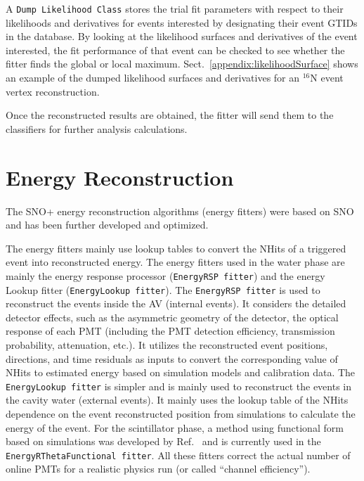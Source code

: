 A \texttt{Dump Likelihood Class} stores the trial fit parameters with respect to their likelihoods and derivatives for events interested by designating their event GTIDs in the database. By looking at the likelihood surfaces and derivatives of the event interested, the fit performance of that event can be checked to see whether the fitter finds the global or local maximum. Sect.~\ref{appendix:likelihoodSurface} shows an example of the dumped likelihood surfaces and derivatives for an $^{16}$N event vertex reconstruction. 

Once the reconstructed results are obtained, the fitter will send them to the classifiers for further analysis calculations. 

\section{Energy Reconstruction}\label{sect:energyFitter}
The SNO+ energy reconstruction algorithms (energy fitters) were based on SNO\cite{boulay2004direct,moffat2001optical} and has been further developed and optimized\cite{jones2011background,walker2016study,energyRSP}. 

The energy fitters mainly use lookup tables to convert the NHits of a triggered event into reconstructed energy. The energy fitters used in the water phase are mainly the energy response processor (\texttt{EnergyRSP fitter})\cite{boulay2004direct,moffat2001optical,walker2016study} and the energy Lookup fitter (\texttt{EnergyLookup fitter})\cite{jones2011background,energyFunctional}. The \texttt{EnergyRSP fitter} is used to reconstruct the events inside the AV (internal events). It considers the detailed detector effects, such as the asymmetric geometry of the detector, the optical response of each PMT (including the PMT detection efficiency, transmission probability, attenuation, etc.). It utilizes the reconstructed event positions, directions, and time residuals as inputs to convert the corresponding value of NHits to estimated energy based on simulation models and calibration data. The \texttt{EnergyLookup fitter} is simpler and is mainly used to reconstruct the events in the cavity water (external events). It mainly uses the lookup table of the NHits dependence on the event reconstructed position from simulations to calculate the energy of the event\cite{jones2011background}. For the scintillator phase, a method using functional form based on simulations was developed by Ref.~\cite{energyFunctional,energyRThetaFunctional} and is currently used in the \texttt{EnergyRThetaFunctional fitter}. All these fitters correct the actual number of online PMTs for a realistic physics run (or called ``channel efficiency''). 

